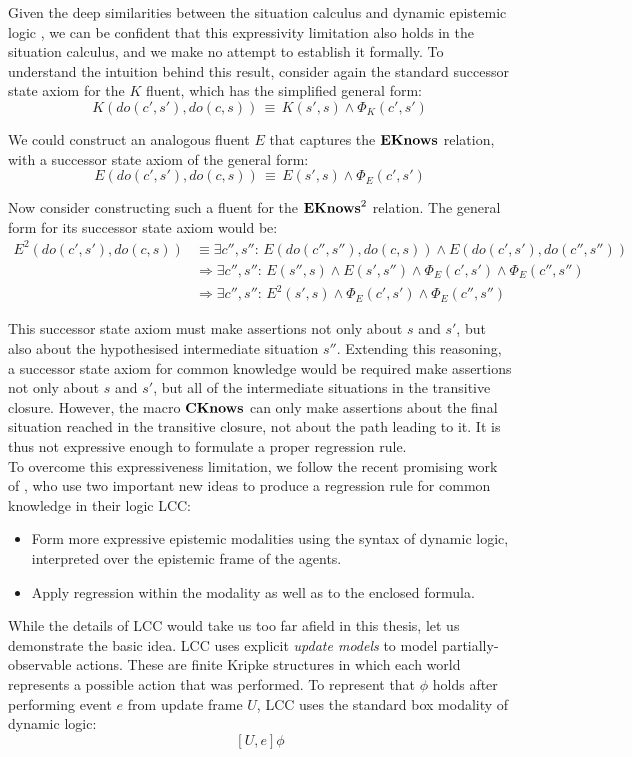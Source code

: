 Given the deep similarities between the situation calculus and dynamic
epistemic logic \citep{vanbentham07ml_sitcalc}, we can be confident
that this expressivity limitation also holds in the situation calculus,
and we make no attempt to establish it formally. To understand the
intuition behind this result, consider again the standard successor
state axiom for the $K$ fluent, which has the simplified general
form:\[
K(do(c',s'),do(c,s))\,\equiv\, K(s',s)\wedge\Phi_{K}(c',s')\]


We could construct an analogous fluent $E$ that captures the $\mathbf{EKnows}$
relation, with a successor state axiom of the general form:\[
E(do(c',s'),do(c,s))\,\equiv\, E(s',s)\wedge\Phi_{E}(c',s')\]


Now consider constructing such a fluent for the $\mathbf{EKnows}^{2}$ relation.
The general form for its successor state axiom would be:\begin{align*}
E^{2}(do(c',s'),do(c,s)) & \equiv\exists c'',s'':\, E(do(c'',s''),do(c,s))\wedge E(do(c',s'),do(c'',s''))\\
 & \Rightarrow\exists c'',s'':\, E(s'',s)\wedge E(s',s'')\wedge\Phi_{E}(c',s')\wedge\Phi_{E}(c'',s'')\\
 & \Rightarrow\exists c'',s'':\, E^{2}(s',s)\wedge\Phi_{E}(c',s')\wedge\Phi_{E}(c'',s'')\end{align*}


This successor state axiom must make assertions not only about $s$
and $s'$, but also about the hypothesised intermediate situation
$s''$. Extending this reasoning, a successor state axiom for common
knowledge would be required make assertions not only about $s$ and
$s'$, but all of the intermediate situations in the transitive closure.
However, the macro $\mathbf{CKnows}$ can only make assertions about the final
situation reached in the transitive closure, not about the path leading
to it. It is thus not expressive enough to formulate a proper regression
rule.\\


To overcome this expressiveness limitation, we follow the recent promising
work of \citet{vanBenthem06lcc}, who use two important new ideas
to produce a regression rule for common knowledge in their logic LCC:

\begin{itemize}
\item Form more expressive epistemic modalities using the syntax of dynamic
logic, interpreted over the epistemic frame of the agents. 
\item Apply regression within the modality as well as to the enclosed formula. 
\end{itemize}
While the details of LCC would take us too far afield in this thesis,
let us demonstrate the basic idea. LCC uses explicit \emph{update
models} to model partially-observable actions. These are finite Kripke
structures in which each world represents a possible action that was
performed. To represent that $\phi$ holds after performing event
$e$ from update frame $U$, LCC uses the standard box modality of
dynamic logic:\[
[U,e]\phi\]


